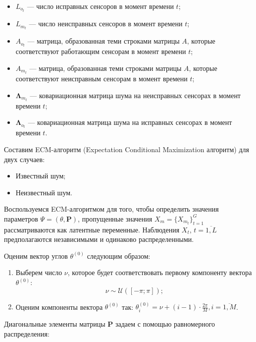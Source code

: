 \documentclass[11pt]{article}
\begin{document}
\begin{itemize}
\item
$L_{o_t}$ --- число исправных сенсоров в момент времени $t$;
\item
 $L_{m_t}$ --- число неисправных сенсоров в момент времени $t$;
\item 
$A_{o_t}$ --- матрица, образованная теми строками матрицы $A$, которые соответствуют работающим сенсорам в момент времени $t$; 
\item
$A_{m_t}$ --- матрица, образованная теми строками матрицы $A$, которые соответствуют неисправным сенсорам в момент времени $t$;
\item
$\mathbf{\Lambda}_{m_t}$ --- ковариационная матрица шума на неисправных сенсорах в момент времени $t$;
\item 
 $\mathbf{\Lambda}_{o_t}$ --- ковариационная матрица шума на исправных сенсорах в момент времени $t$.
\end{itemize}
Составим ECM-алгоритм (Expectation Conditional Maximization алгоритм) для двух случаев:
\begin{itemize}
\item
Известный шум;
\item
Неизвестный шум.
\end{itemize}
\clearpage
\begin{center}
\fontsize{16}{20}\selectfont {}
\end{center}
Воспользуемся ECM-алгоритмом для того, чтобы определить значения параметров $\Psi = (\theta, \mathbf{P})$, пропущенные значения $X_m=\{X_{m_t}\}_{t=1}^G$ рассматриваются как латентные переменные. Наблюдения $X_t$, $t=\overline{1,L}$ предполагаются независимыми и одинаково распределенными.
\begin{center}
\fontsize{14}{18}\selectfont {}
\end{center}
Оценим вектор углов $\theta^{(0)}$ следующим образом:
\begin{enumerate}
\item
Выберем число $\nu$, которое будет соответствовать первому компоненту вектора $\theta^{(0)}$:
\begin{equation}
\nu \sim \mathcal{U}([-\pi;\pi]);
\end{equation}
\item
Оценим компоненты вектора $\theta^{(0)}$ так:  $\theta^{(0)}_i = \nu + (i-1)\cdot \frac{2\pi}{M}, i = \overline{1,M}$.
\end{enumerate}
Диагональные элементы матрицы $\mathbf{P}$ задаем с помощью равномерного распределения:
\end{document}
